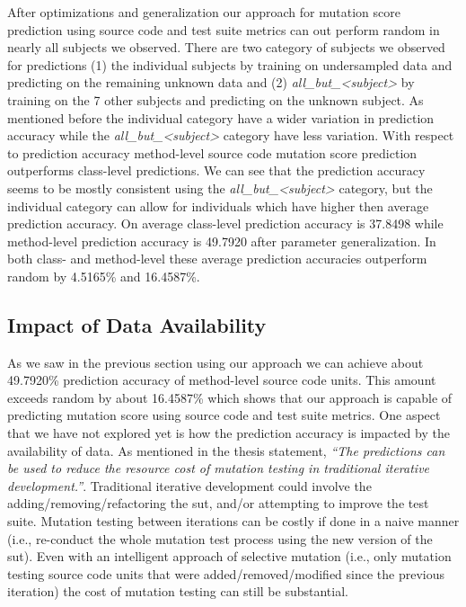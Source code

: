 After optimizations and generalization our approach for mutation score prediction using source code and test suite metrics can out perform random in nearly all subjects we observed. There are two category of subjects we observed for predictions (1) the individual subjects by training on undersampled data and predicting on the remaining unknown data and (2) \emph{all\_but\_<subject>} by training on the 7 other subjects and predicting on the unknown subject. As mentioned before the individual category have a wider variation in prediction accuracy while the \emph{all\_but\_<subject>} category have less variation. With respect to prediction accuracy method-level source code mutation score prediction outperforms class-level predictions. We can see that the prediction accuracy seems to be mostly consistent using the \emph{all\_but\_<subject>} category, but the individual category can allow for individuals which have higher then average prediction accuracy. On average class-level prediction accuracy is 37.8498 while method-level prediction accuracy is 49.7920 after parameter generalization. In both class- and method-level these average prediction accuracies outperform random by 4.5165\% and 16.4587\%.


\subsection{Impact of Data Availability}
\label{subsec:experiment_data}
As we saw in the previous section using our approach we can achieve about 49.7920\% prediction accuracy of method-level source code units. This amount exceeds random by about 16.4587\% which shows that our approach is capable of predicting mutation score using source code and test suite metrics. One aspect that we have not explored yet is how the prediction accuracy is impacted by the availability of data. As mentioned in the thesis statement, \emph{``The predictions can be used to reduce the resource cost of mutation testing in traditional iterative development.''}. Traditional iterative development could involve the adding/removing/refactoring the \gls{sut}, and/or attempting to improve the test suite. Mutation testing between iterations can be costly if done in a naive manner (i.e., re-conduct the whole mutation test process using the new version of the \gls{sut}). Even with an intelligent approach of selective mutation (i.e., only mutation testing source code units that were added/removed/modified since the previous iteration) the cost of mutation testing can still be substantial.

